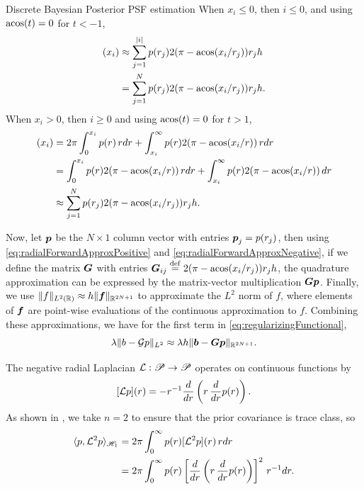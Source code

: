 \begin{chapter}{Discrete Bayesian Posterior PSF estimation}
When $x_i \le 0$, then $i \le 0$, and using $\operatorname*{acos}(t) = 0$ for $t<-1$,
\begin{align}
  [\G p](x_i) 
    &\approx \sum_{j=1}^{|i|} p(r_j)2(\pi - \acos(x_i/r_j)) r_jh \nonumber\\
    &= \sum_{j=1}^{N} p(r_j)2(\pi - \acos(x_i/r_j)) r_jh. \label{eq:radialForwardApproxPositive}
\end{align}
When $x_i > 0$, then $i \ge 0$ and using $\operatorname*{acos}(t) = 0$ for $t>1$,
\begin{align}
  [\G p](x_i) 
    &= 2\pi \int_0^{x_i} p(r)\,rdr + \int_{x_i}^\infty p(r)2(\pi - \acos(x_i/r))\,rdr\nonumber \\
    &= \int_0^{x_i} p(r) 2(\pi - \acos(x_i/r))\,rdr + \int_{x_i}^\infty p(r)2(\pi - \acos(x_i/r))\,dr\nonumber \\
    &\approx \sum_{j=1}^{N} p(r_j)2(\pi - \acos(x_i/r_j)) r_jh. \label{eq:radialForwardApproxNegative}
\end{align}

Now, let $\mbox{\boldmath$p$}$ be the $N\times 1$ column vector with entries $\mbox{\boldmath$p$}_j = p(r_j)$,
then using \eqref{eq:radialForwardApproxPositive} and \eqref{eq:radialForwardApproxNegative}, if we define the matrix $\mbox{\boldmath$G$}$ with entries $\mbox{\boldmath$G$}_{ij} \stackrel{\rm def}{=} 2(\pi - \operatorname*{acos}(x_i/r_j)) r_j h$, the quadrature approximation can be expressed by the matrix-vector multiplication $\mbox{\boldmath$G$} \mbox{\boldmath$p$}$.
Finally, we use $\|f\|_{L^2(\mathbb R)} \approx h\|\mbox{\boldmath$f$}\|_{\mathbb R^{2N+1}}$ to approximate the $L^2$ norm of $f$, where elements of $\mbox{\boldmath$f$}$ are point-wise evaluations of the continuous approximation to $f$.
Combining these approximations, we have for the first term in \eqref{eq:regularizingFunctional},
\begin{equation}
  \lambda \|b - \mathcal G p\|_{L^2} \approx \lambda h \|\mbox{\boldmath$b$} - \mbox{\boldmath$G$} \mbox{\boldmath$p$}\|_{\mathbb R^{2N+1}}.
\end{equation}

The negative radial Laplacian $\mathcal L: \mathscr P \to \mathscr P$ operates on continuous functions by
\begin{equation} \label{eq:radialLaplacian}
  [\mathcal L p](r) = -r^{-1}\frac{d}{dr}\left(r \,\frac{d}{dr}p(r)\right). 
\end{equation}
As shown in , we take $n=2$ to ensure that the prior covariance is trace class, so
\begin{align} 
  \langle p, \mathcal L^2 p \rangle_{\mathscr H_1}
  &= 2\pi\int_0^\infty p(r) [\mathcal L^2 p](r) \, rdr \nonumber\\
  &= 2\pi\int_0^\infty p(r) \left[\frac{d}{dr}\left(r \,\frac{d}{dr}p(r)\right)\right]^2 \, r^{-1}dr.
  \label{eq:infiniteRadialInnerProduct}
\end{align}


\end{chapter}
